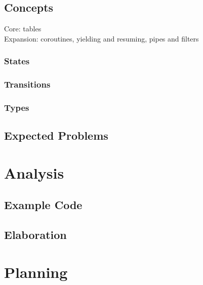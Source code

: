 \documentclass{article}
\begin{document}
\subsection{Concepts}
Core: tables\\
Expansion: coroutines, yielding and resuming, pipes and filters  
\subsubsection{States}
\subsubsection{Transitions}
\subsubsection{Types}
\subsection{Expected Problems}

\section{Analysis}
\subsection{Example Code}
\subsection{Elaboration}

\newpage
\appendix
\section{Planning}
\end{document}
